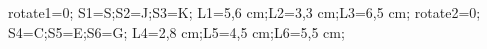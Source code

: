 \documentclass[exercice]{thedocument}%
\begin{document}
%
    \>rotate1=0;%
    \>S1=S;\>S2=J;\>S3=K;%
    \>L1=5,6 cm;\>L2=3,3 cm;\>L3=6,5 cm;%
    \>rotate2=0;%
    \>S4=C;\>S5=E;\>S6=G;%
    \>L4=2,8 cm;\>L5=4,5 cm;\>L6=5,5 cm;%
\end{document}
